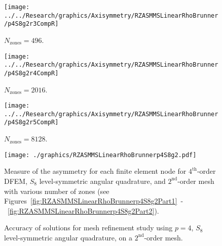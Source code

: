 \documentclass[12pt,letterpaper]{article}
\begin{document}
\begin{sidewaysfigure}[!htb]
\centering
\begin{subfigure}{0.33\textwidth}
\texttt{[image: ../../Research/graphics/Axisymmetry/RZASMMSLinearRhoBrunner/p4S8g2r3CompR]}
\caption{$N_\text{zones}=496$.}
\end{subfigure}%
\begin{subfigure}{0.33\textwidth}
\texttt{[image: ../../Research/graphics/Axisymmetry/RZASMMSLinearRhoBrunner/p4S8g2r4CompR]}
\caption{$N_\text{zones}=2016$.}
\end{subfigure}%
\begin{subfigure}{0.33\textwidth}
\texttt{[image: ../../Research/graphics/Axisymmetry/RZASMMSLinearRhoBrunner/p4S8g2r5CompR]}
\caption{$N_\text{zones}=8128$.}
\end{subfigure}
\caption{Relative asymmetry for $p=4$ finite elements on a $2^\text{nd}$-order mesh for $S_8$ level-symmetric angular quadrature; mesh overlay may be removed for clarity.}
\label{fig:RZASMMSLinearRhoBrunnerp4S8g2Part2}
\end{sidewaysfigure}

\begin{figure}[!htb]
\centering
\texttt{[image: ./graphics/RZASMMSLinearRhoBrunnerp4S8g2.pdf]}
\caption{Measure of the asymmetry for each finite element node for $4^\text{th}$-order DFEM, $S_8$ level-symmetric angular quadrature, and $2^\text{nd}$-order mesh with various number of zones (see Figures~\ref{fig:RZASMMSLinearRhoBrunnerp4S8g2Part1}~-~\ref{fig:RZASMMSLinearRhoBrunnerp4S8g2Part2}).}
\label{fig:RZASMMSLinearRhoBrunnerp4S8g2Nodes}
\end{figure}

\begin{figure}[!htb]
\centering
{}
\caption{Accuracy of solutions for mesh refinement study using $p=4$, $S_8$ level-symmetric angular quadrature, on a $2^\text{nd}$-order mesh.}
\label{fig:RZASMMSLinearRhoBrunnerp4S8g2Accuracy}
\end{figure}
\end{document}
